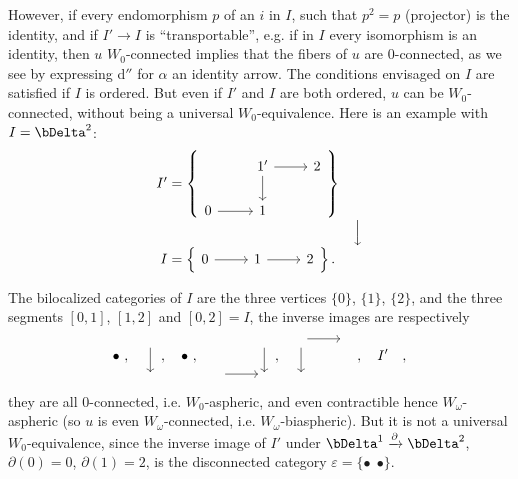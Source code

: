 However, if every endomorphism $p$ of an $i$ in $I$, such that $p^2 = p$ (projector) is the identity, and if $I' \longrightarrow I$ is ``transportable'', e.g. if in $I$ every isomorphism is an identity, then $u$ $W_0$-connected implies that the fibers of $u$ are 0-connected, as we see by expressing d$''$ for $\alpha$ an identity arrow. The conditions envisaged on $I$ are satisfied if $I$ is ordered. But even if $I'$ and $I$ are both ordered, $u$ can be $W_0$-connected, without being a universal $W_0$-equivalence. Here is an example with $I = \bDelta^2$:
\[
\begin{array}{r@{\;}l@{\quad}c}
I' = & \left\{\begin{tikzcd}[ampersand replacement=\&]
 \& 1' \arrow[r] \arrow[d] \& 2 \\
0 \arrow[r] \& 1 \&
\end{tikzcd}\right\} & \\[1ex]
 & & \Big\downarrow \\[1ex]
I = & \left\{\begin{tikzcd}[ampersand replacement=\&]
0 \arrow[r] \& 1 \arrow[r] \& 2
\end{tikzcd}\right\}. &
\end{array}
\]

The bilocalized categories of $I$ are the three vertices $\{0\}$, $\{1\}$, $\{2\}$, and the three segments $[0,1]$, $[1,2]$ and $[0,2] = I$, the inverse images are respectively
\[
\bullet\ ,\quad
\begin{tikzcd}[row sep=normal] {} \arrow[d] \\ {} \end{tikzcd}\ ,\quad
\bullet\ ,\quad
\begin{tikzcd}[row sep=normal] & {} \arrow[d] \\ {} \arrow[r] & {} \end{tikzcd}\ ,\quad
\begin{tikzcd}[row sep=normal] {} \arrow[r] \arrow[d] & {} \\ {} & \end{tikzcd}\ ,\quad
I'\quad ,
\]
they are all 0-connected, i.e. $W_0$-aspheric, and even contractible hence $W_\omega$-aspheric (so $u$ is even $W_\omega$-connected, i.e. $W_\omega$-biaspheric). But it is not a universal $W_0$-equivalence, since the inverse image of $I'$ under $\bDelta^1 \xrightarrow{\partial} \bDelta^2$, $\partial(0) = 0$, $\partial(1) = 2$, is the disconnected category $\varepsilon = \{\bullet\ \ \bullet\}$.

